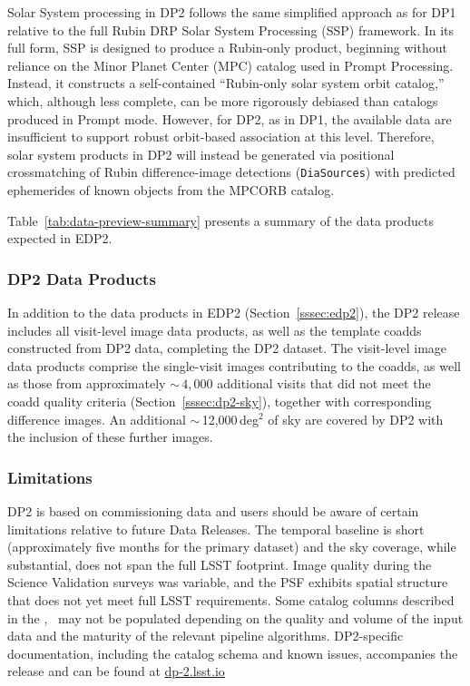 Solar System processing in DP2 follows the same simplified approach as for DP1 relative to the full Rubin DRP Solar System Processing (SSP) framework.
In its full form, SSP is designed to produce a Rubin-only product, beginning without reliance on the Minor Planet Center (MPC) catalog used in Prompt Processing.
Instead, it constructs a self-contained ``Rubin-only solar system orbit catalog,'' which, although less complete, can be more rigorously debiased than catalogs produced in Prompt mode.
However, for DP2, as in DP1, the available data are insufficient to support robust orbit-based association at this level.
Therefore, solar system products in DP2 will instead be generated via positional crossmatching of Rubin difference-image detections (\texttt{DiaSources}) with predicted ephemerides of known objects from the MPCORB catalog.

Table~\ref{tab:data-preview-summary} presents a summary of the data products expected in EDP2.

\subsubsection{DP2 Data Products}
\label{sssec:dp2-full}

In addition to the data products in EDP2 (Section~\ref{sssec:edp2}), the DP2 release includes all visit-level image data products, as well as the template coadds constructed from DP2 data, completing the DP2 dataset.
The visit-level image data products comprise the single-visit images contributing to the coadds, as well as those from approximately $\sim\,4,000$ additional visits that did not meet the coadd quality criteria (Section~\ref{sssec:dp2-sky}), together with corresponding difference images.
An additional $\sim$\,12,000\,deg$^{2}$ of sky are covered by DP2 with the inclusion of these further images.

\subsubsection{Limitations}

DP2 is based on commissioning data and users should be aware of certain limitations relative to future Data Releases.
The temporal baseline is short (approximately five months for the primary dataset) and the sky coverage, while substantial, does not span the full LSST footprint.
Image quality during the Science Validation surveys was variable, and the PSF exhibits spatial structure that does not yet meet full LSST requirements.
Some catalog columns described in the \dpdd{},~ may not be populated depending on the quality and volume of the input data and the maturity of the relevant pipeline algorithms.
DP2-specific documentation, including the catalog schema and known issues, accompanies the release and can be found at \url{dp-2.lsst.io}

